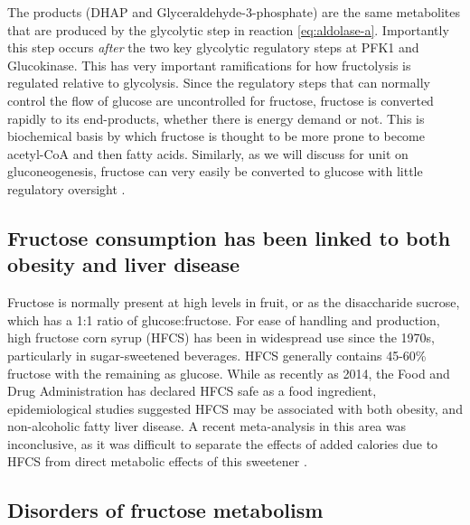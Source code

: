 \documentclass{tufte-handout}
\begin{document}
The products (DHAP and Glyceraldehyde-3-phosphate) are the same metabolites that are produced by the glycolytic step in reaction \ref{eq:aldolase-a}.  Importantly this step occurs \emph{after} the two key glycolytic regulatory steps at PFK1 and Glucokinase.  This has very important ramifications for how fructolysis is regulated  relative to glycolysis.  Since the regulatory steps that can normally control the flow of glucose are uncontrolled for fructose, fructose is converted rapidly to its end-products, whether there is energy demand or not.  This is biochemical basis by which fructose is thought to be more prone to become acetyl-CoA and then fatty acids.  Similarly, as we will discuss for unit on gluconeogenesis, fructose can very easily be converted to glucose with little regulatory oversight \citep{Kim2016d}.

\subsection{Fructose consumption has been linked to both obesity and liver disease}

Fructose is normally present at high levels in fruit, or as the disaccharide sucrose, which has a 1:1 ratio of glucose:fructose.  For ease of handling and production, high fructose corn syrup (HFCS) has been in widespread use since the 1970s, particularly in sugar-sweetened beverages.  HFCS generally contains 45-60\% fructose with the remaining as glucose.   While as recently as 2014, the Food and Drug Administration has declared HFCS safe as a food ingredient, epidemiological studies suggested HFCS may be associated with both obesity, and non-alcoholic fatty liver disease.  A recent meta-analysis in this area was inconclusive, as it was difficult to separate the effects of added calories due to HFCS from direct metabolic effects of this sweetener \citep{Chung2014}.

\subsection{Disorders of fructose metabolism}
\end{document}
